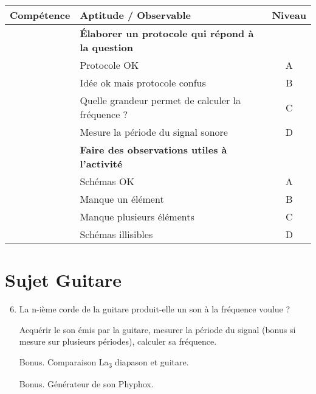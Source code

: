 \documentclass[12pt,a4paper]{article}
\begin{document}
\begin{center}
\begin{tabular}{l|l|c}
\textbf{Compétence} & \textbf{Aptitude} / Observable & \textbf{Niveau} \\
\hline \hline
\anarai 	& \textbf{Élaborer un protocole qui répond à la question} 	& \\
				& Protocole OK																				& A \\
				& 	Idée ok mais protocole confus												& B \\
				& Quelle grandeur permet de calculer la fréquence ?			& C \\
				& Mesure la période du signal sonore										& D \\
\hline
\rea		 	& \textbf{Faire des observations utiles à l'activité} 	& \\
				& Schémas OK																				& A \\
				& 	Manque un élément																	& B \\
				& Manque plusieurs éléments													& C \\
				& Schémas illisibles																		& D \\
\end{tabular}
\end{center}

\section*{Sujet Guitare}

\begin{enumerate}
\setcounter{enumi}{5}
\item \app{}

La n-ième corde de la guitare produit-elle un son à la fréquence voulue ?

\anarai{}

Acquérir le son émis par la guitare, mesurer la période du signal (bonus si mesure sur plusieurs périodes), calculer sa fréquence.

\item[Bonus.] Comparaison La\textsubscript{3} diapason et guitare.

\item[Bonus.] Générateur de son Phyphox.
\end{enumerate}
\end{document}
